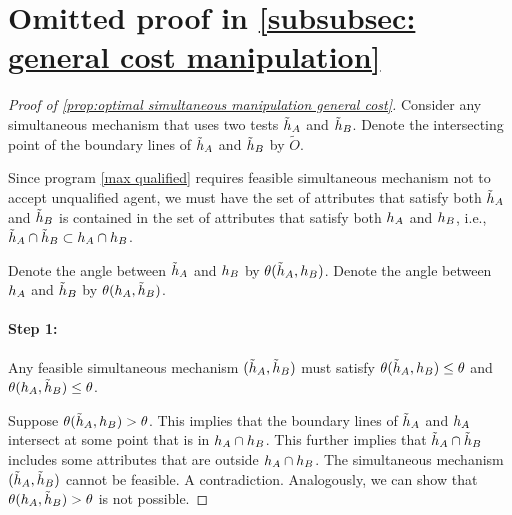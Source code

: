 \section{Omitted proof in \cref{subsubsec: general cost manipulation}}\label{appendix:general costs}
\begin{proof}[Proof of \cref{prop:optimal simultaneous manipulation general cost}]
Consider any simultaneous mechanism that uses two tests $\tilde {h}_A$ and $\tilde {h}_B$.
Denote the intersecting point of the boundary lines of $\tilde {h}_A$ and $\tilde {h}_B$ by $\tilde O$.

Since program \ref{max qualified} requires feasible simultaneous mechanism not to accept unqualified agent, we must have the set of attributes that satisfy both $\tilde {h}_A$ and $\tilde {h}_B$ is contained in the set of attributes that satisfy both $ h_A$ and $h_B$, i.e., $\tilde {h}_A \cap \tilde {h}_B \subset h_A\cap h_B$.

Denote the angle between $ \tilde{h}_A$ and $h_B$ by $\theta( \tilde{h}_A,h_B)$.
Denote the angle between $ h_A$ and $\tilde{h}_B$ by $\theta( h_A,\tilde{h}_B)$.

\paragraph{Step 1:} Any feasible simultaneous mechanism $(\tilde {h}_A,\tilde {h}_B)$ must satisfy $\theta( \tilde{h}_A,h_B)\leq\theta$ and $\theta( h_A,\tilde{h}_B)\leq \theta$.

Suppose $\theta( \tilde{h}_A,h_B)>\theta$. 
This implies that the boundary lines of $\tilde {h}_A$ and $ h_A$ intersect at some point that is in $ h_A\cap h_B$.
This further implies that $\tilde {h}_A\cap \tilde {h}_B$ includes some attributes that are outside $ h_A\cap h_B$.
The simultaneous mechanism $(\tilde {h}_A,\tilde {h}_B)$ cannot be feasible. A contradiction.
Analogously, we can show that $\theta( h_A,\tilde{h}_B)>\theta$ is not possible.




\end{proof}
